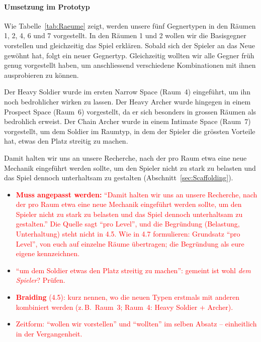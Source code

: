 \documentclass[../Main.tex]{subfiles}
\begin{document}
\paragraph{Umsetzung im Prototyp}
Wie Tabelle~\ref{tab:Raeume} zeigt, werden unsere fünf Gegnertypen in den Räumen 1, 2, 4, 6 und 7 vorgestellt. In den Räumen 1 und 2 wollen wir die Basisgegner vorstellen und gleichzeitig das Spiel erklären. Sobald sich der Spieler an das Neue gewöhnt hat, folgt ein neuer Gegnertyp. Gleichzeitig wollten wir alle Gegner früh genug vorgestellt haben, um anschliessend verschiedene Kombinationen mit ihnen ausprobieren zu können.

Der Heavy Soldier wurde im ersten Narrow Space (Raum~4) eingeführt, um ihn noch bedrohlicher wirken zu lassen. Der Heavy Archer wurde hingegen in einem Prospect Space (Raum~6) vorgestellt, da er sich besonders in grossen Räumen als bedrohlich erweist. Der Chain Archer wurde in einem Intimate Space (Raum~7) vorgestellt, um dem Soldier im Raumtyp, in dem der Spieler die grössten Vorteile hat, etwas den Platz streitig zu machen.

Damit halten wir uns an unsere Recherche, nach der pro Raum etwa eine neue Mechanik eingeführt werden sollte, um den Spieler nicht zu stark zu belasten und das Spiel dennoch unterhaltsam zu gestalten (Abschnitt~\ref{sec:Scaffolding}).

\begin{itemize}[leftmargin=1.5cm]
    \item \textcolor{red}{\textbf{Muss angepasst werden:} \enquote{Damit halten wir uns an unsere Recherche, nach der pro Raum etwa eine neue Mechanik eingeführt werden sollte, um den Spieler nicht zu stark zu belasten und das Spiel dennoch unterhaltsam zu gestalten.} Die Quelle sagt \enquote{pro Level}, und die Begründung (Belastung, Unterhaltung) steht nicht in 4.5. Wie in 4.7 formulieren: Grundsatz \enquote{pro Level}, von euch auf einzelne Räume übertragen; die Begründung als eure eigene kennzeichnen.}
    \item \textcolor{red}{\enquote{um dem Soldier etwas den Platz streitig zu machen}: gemeint ist wohl \emph{dem Spieler}? Prüfen.}
    \item \textcolor{red}{\textbf{Braiding} (4.5): kurz nennen, wo die neuen Typen erstmals mit anderen kombiniert werden (z.\,B.\ Raum~3; Raum~4: Heavy Soldier + Archer).}
    \item \textcolor{red}{Zeitform: \enquote{wollen wir vorstellen} und \enquote{wollten} im selben Absatz -- einheitlich in der Vergangenheit.}
\end{itemize}
\end{document}
